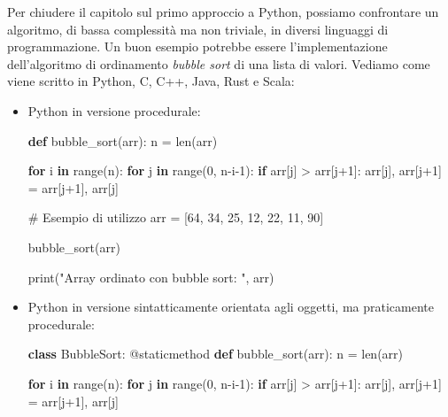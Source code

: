 \documentclass[
  letterpaper,
]{scrbook}
\newenvironment{Shaded}{\begin{snugshade}}{\end{snugshade}}
\newcommand{\AttributeTok}[1]{\textcolor[rgb]{0.40,0.45,0.13}{#1}}
\newcommand{\BuiltInTok}[1]{\textcolor[rgb]{0.00,0.23,0.31}{#1}}
\newcommand{\CommentTok}[1]{\textcolor[rgb]{0.37,0.37,0.37}{#1}}
\newcommand{\ControlFlowTok}[1]{\textcolor[rgb]{0.00,0.23,0.31}{\textbf{#1}}}
\newcommand{\DecValTok}[1]{\textcolor[rgb]{0.68,0.00,0.00}{#1}}
\newcommand{\KeywordTok}[1]{\textcolor[rgb]{0.00,0.23,0.31}{\textbf{#1}}}
\newcommand{\NormalTok}[1]{\textcolor[rgb]{0.00,0.23,0.31}{#1}}
\newcommand{\OperatorTok}[1]{\textcolor[rgb]{0.37,0.37,0.37}{#1}}
\newcommand{\StringTok}[1]{\textcolor[rgb]{0.13,0.47,0.30}{#1}}
\begin{document}
Per chiudere il capitolo sul primo approccio a Python, possiamo
confrontare un algoritmo, di bassa complessità ma non triviale, in
diversi linguaggi di programmazione. Un buon esempio potrebbe essere
l'implementazione dell'algoritmo di ordinamento \emph{bubble sort} di
una lista di valori. Vediamo come viene scritto in Python, C, C++, Java,
Rust e Scala:

\begin{itemize}
\item
  Python in versione procedurale:

\begin{Shaded}
\begin{Highlighting}[]
\KeywordTok{def}\NormalTok{ bubble\_sort(arr):}
\NormalTok{  n }\OperatorTok{=} \BuiltInTok{len}\NormalTok{(arr)}

  \ControlFlowTok{for}\NormalTok{ i }\KeywordTok{in} \BuiltInTok{range}\NormalTok{(n):}
    \ControlFlowTok{for}\NormalTok{ j }\KeywordTok{in} \BuiltInTok{range}\NormalTok{(}\DecValTok{0}\NormalTok{, n}\OperatorTok{{-}}\NormalTok{i}\OperatorTok{{-}}\DecValTok{1}\NormalTok{):}
      \ControlFlowTok{if}\NormalTok{ arr[j] }\OperatorTok{\textgreater{}}\NormalTok{ arr[j}\OperatorTok{+}\DecValTok{1}\NormalTok{]:}
\NormalTok{        arr[j], arr[j}\OperatorTok{+}\DecValTok{1}\NormalTok{] }\OperatorTok{=}\NormalTok{ arr[j}\OperatorTok{+}\DecValTok{1}\NormalTok{], arr[j]}

\CommentTok{\# Esempio di utilizzo}
\NormalTok{arr }\OperatorTok{=}\NormalTok{ [}\DecValTok{64}\NormalTok{, }\DecValTok{34}\NormalTok{, }\DecValTok{25}\NormalTok{, }\DecValTok{12}\NormalTok{, }\DecValTok{22}\NormalTok{, }\DecValTok{11}\NormalTok{, }\DecValTok{90}\NormalTok{]}

\NormalTok{bubble\_sort(arr)}

\BuiltInTok{print}\NormalTok{(}\StringTok{"Array ordinato con bubble sort: "}\NormalTok{, arr)}
\end{Highlighting}
\end{Shaded}
\item
  Python in versione sintatticamente orientata agli oggetti, ma
  praticamente procedurale:

\begin{Shaded}
\begin{Highlighting}[]
\KeywordTok{class}\NormalTok{ BubbleSort:}
  \AttributeTok{@staticmethod}
  \KeywordTok{def}\NormalTok{ bubble\_sort(arr):}
\NormalTok{    n }\OperatorTok{=} \BuiltInTok{len}\NormalTok{(arr)}

    \ControlFlowTok{for}\NormalTok{ i }\KeywordTok{in} \BuiltInTok{range}\NormalTok{(n):}
      \ControlFlowTok{for}\NormalTok{ j }\KeywordTok{in} \BuiltInTok{range}\NormalTok{(}\DecValTok{0}\NormalTok{, n}\OperatorTok{{-}}\NormalTok{i}\OperatorTok{{-}}\DecValTok{1}\NormalTok{):}
        \ControlFlowTok{if}\NormalTok{ arr[j] }\OperatorTok{\textgreater{}}\NormalTok{ arr[j}\OperatorTok{+}\DecValTok{1}\NormalTok{]:}
\NormalTok{          arr[j], arr[j}\OperatorTok{+}\DecValTok{1}\NormalTok{] }\OperatorTok{=}\NormalTok{ arr[j}\OperatorTok{+}\DecValTok{1}\NormalTok{], arr[j]}


\end{Highlighting}
\end{Shaded}
\end{itemize}
\end{document}
